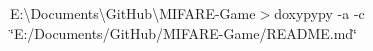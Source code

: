 E\+:\textbackslash{}\+Documents\textbackslash{}\+Git\+Hub\textbackslash{}\+M\+I\+F\+A\+RE-\/Game$>$doxypypy -\/a -\/c \char`\"{}\+E\+:/\+Documents/\+Git\+Hub/\+M\+I\+F\+A\+R\+E-\/\+Game/\+R\+E\+A\+D\+M\+E.\+md\char`\"{} 